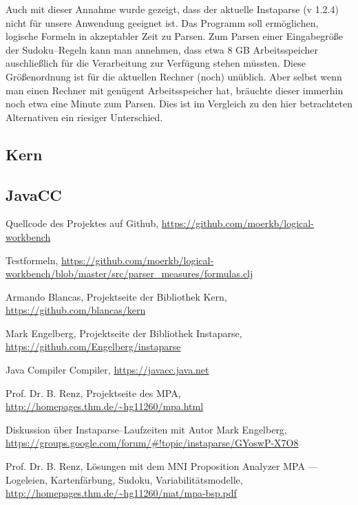 \documentclass[ngerman,a4paper,abstracton,open=right,twoside=false,toc=listofnumbered,bibtotocnumbered]{scrreprt}
\begin{document}
Auch mit dieser Annahme wurde gezeigt, dass der aktuelle Instaparse (v 1.2.4) nicht für unsere Anwendung geeignet ist. Das Programm soll ermöglichen, logische Formeln in akzeptabler Zeit zu Parsen. Zum Parsen einer Eingabegröße der Sudoku--Regeln kann man annehmen, dass etwa 8 GB Arbeitsspeicher auschließlich für die Verarbeitung zur Verfügung stehen müssten. Diese Größenordnung ist für die aktuellen Rechner (noch) unüblich. Aber selbst wenn man einen Rechner mit genügent Arbeitsspeicher hat, bräuchte dieser immerhin noch etwa eine Minute zum Parsen. Dies ist im Vergleich zu den hier betrachteten Alternativen ein riesiger Unterschied.

\subsection{Kern}
\subsection{JavaCC}

\appendix

\begin{thebibliography}{7}
		Quellcode des Projektes auf Github, 
		\url{https://github.com/moerkb/logical-workbench}

		Testformeln,
		\url{https://github.com/moerkb/logical-workbench/blob/master/src/parser_measures/formulas.clj}

		Armando Blancas,
		Projektseite der Bibliothek Kern, 
		\url{https://github.com/blancas/kern}

		Mark Engelberg,
		Projektseite der Bibliothek Instaparse,
		\url{https://github.com/Engelberg/instaparse}

		Java Compiler Compiler,
		\url{https://javacc.java.net}

		Prof. Dr. B. Renz,
		Projektseite des MPA,
		\url{http://homepages.thm.de/~hg11260/mpa.html}

		Diskussion über Instaparse--Laufzeiten mit Autor Mark Engelberg, 
		\url{https://groups.google.com/forum/#!topic/instaparse/GYoswP-X7O8}

		Prof. Dr. B. Renz,
		Lösungen mit dem MNI Proposition Analyzer MPA --- Logeleien, Kartenfärbung, Sudoku, Variabilitätsmodelle,
		\url{http://homepages.thm.de/~hg11260/mat/mpa-bsp.pdf}
\end{thebibliography}
\end{document}
